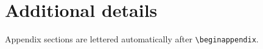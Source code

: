 \section{Additional details}
\label{app:details}
Appendix sections are lettered automatically after \verb|\beginappendix|.
